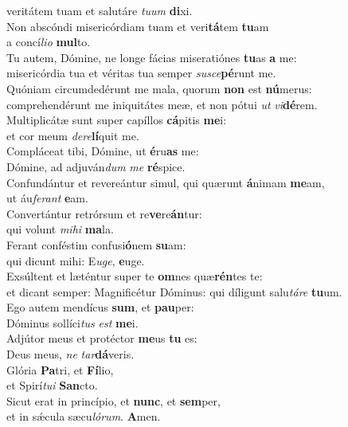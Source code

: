\oddverse veritátem tuam et salutáre \textit{tu}\textit{um} \textbf{di}xi.\\
\evenverse Non abscóndi misericórdiam tuam et veri\textbf{tá}tem \textbf{tu}am~\*\\
\evenverse a concí\textit{li}\textit{o} \textbf{mul}to.\\
\oddverse Tu autem, Dómine, ne longe fácias miseratiónes \textbf{tu}as \textbf{a} me:~\*\\
\oddverse misericórdia tua et véritas tua semper \textit{su}\textit{sce}\textbf{pé}runt me.\\
\evenverse Quóniam circumdedérunt me mala, quorum \textbf{non} est \textbf{nú}merus:~\*\\
\evenverse comprehendérunt me iniquitátes meæ, et non pótui \textit{ut} \textit{vi}\textbf{dé}rem.\\
\oddverse Multiplicátæ sunt super capíllos \textbf{cá}pitis \textbf{me}i:~\*\\
\oddverse et cor meum \textit{de}\textit{re}\textbf{lí}quit me.\\
\evenverse Compláceat tibi, Dómine, ut \textbf{é}ru\textbf{as} me:~\*\\
\evenverse Dómine, ad adjuván\textit{dum} \textit{me} \textbf{ré}spice.\\
\oddverse Confundántur et revereántur simul, qui quærunt \textbf{á}nimam \textbf{me}am,~\*\\
\oddverse ut áu\textit{fe}\textit{rant} \textbf{e}am.\\
\evenverse Convertántur retrórsum et re\textbf{ve}re\textbf{án}tur:~\*\\
\evenverse qui volunt \textit{mi}\textit{hi} \textbf{ma}la.\\
\oddverse Ferant conféstim confusi\textbf{ó}nem \textbf{su}am:~\*\\
\oddverse qui dicunt mihi: E\textit{u}\textit{ge}, \textbf{e}uge.\\
\evenverse Exsúltent et læténtur super te \textbf{om}nes quæ\textbf{rén}tes te:~\*\\
\evenverse et dicant semper: Magnificétur Dóminus: qui díligunt salu\textit{tá}\textit{re} \textbf{tu}um.\\
\oddverse Ego autem mendícus \textbf{sum}, et \textbf{pau}per:~\*\\
\oddverse Dóminus sollíci\textit{tus} \textit{est} \textbf{me}i.\\
\evenverse Adjútor meus et protéctor \textbf{me}us \textbf{tu} es:~\*\\
\evenverse Deus meus, \textit{ne} \textit{tar}\textbf{dá}veris.\\
\oddverse Glória \textbf{Pa}tri, et \textbf{Fí}lio,~\*\\
\oddverse et Spirí\textit{tu}\textit{i} \textbf{San}cto.\\
\evenverse Sicut erat in princípio, et \textbf{nunc}, et \textbf{sem}per,~\*\\
\evenverse et in sǽcula sæcu\textit{ló}\textit{rum}. \textbf{A}men.\\
